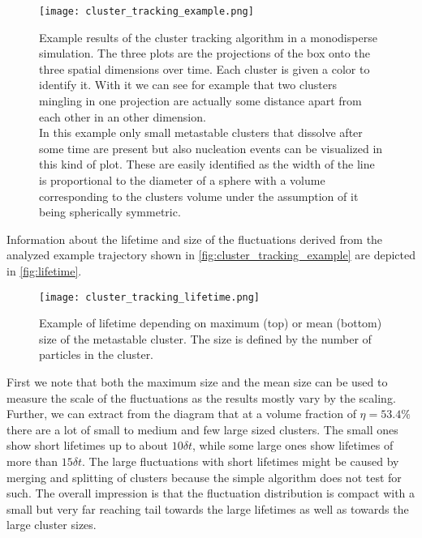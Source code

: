 \begin{figure}[h]
\centering
\texttt{[image: cluster\_tracking\_example.png]}
\caption[Individual cluster tracking example]{Example results of the cluster tracking algorithm in a monodisperse simulation. The three plots are the projections of the box onto the three spatial dimensions over time. Each cluster is given a color to identify it. With it we can see for example that two clusters mingling in one projection are actually some distance apart from each other in an other dimension.\\
In this example only small metastable clusters that dissolve after some time are present but also nucleation events can be visualized in this kind of plot. These are easily identified as the width of the line is proportional to the diameter of a sphere with a volume corresponding to the clusters volume under the assumption of it being spherically symmetric.}
\label{fig:cluster_tracking_example}
\end{figure}
Information about the lifetime and size of the fluctuations derived from the analyzed example trajectory shown in \autoref{fig:cluster_tracking_example} are depicted in \autoref{fig:lifetime}.\\
\begin{figure}[h]
\centering
\texttt{[image: cluster\_tracking\_lifetime.png]}
\caption[Example of correlation between an unstable cluster's size and lifetime]{Example of lifetime depending on  maximum (top) or mean (bottom) size of the metastable cluster. The size is defined by the number of particles in the cluster.}
\label{fig:lifetime}
\end{figure}
First we note that both the maximum size and the mean size can be used to measure the scale of the fluctuations as the results mostly vary by the scaling. Further, we can extract from the diagram that at a volume fraction of $\eta = 53.4\%$ there are a lot of small to medium and few large sized clusters. The small ones show short lifetimes up to about $10 \delta t$, while some large ones show lifetimes of more than $15 \delta t$. The large fluctuations with short lifetimes might be caused by merging and splitting of clusters because the simple algorithm does not test for such. The overall impression is that the fluctuation distribution is compact with a small but very far reaching tail towards the large lifetimes as well as towards the large cluster sizes.
\FloatBarrier



